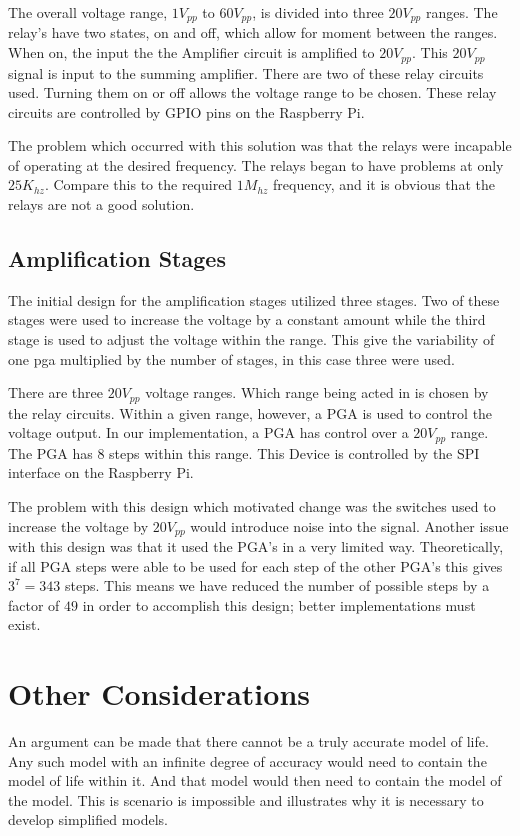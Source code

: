 \documentclass{article}	%
\begin{document}
\begin{multicols}{2}
The overall voltage range,
$1V_{pp}$ to $60V_{pp}$,
is divided into three $20V_{pp}$ ranges.
The relay's have two states,
on and off,
which allow for moment between the ranges.
When on,
the input the the Amplifier circuit is amplified to $20V_{pp}$.
This $20V_{pp}$ signal is input to the summing amplifier.
There are two of these relay circuits used.
Turning them on or off allows the voltage range to be chosen.
These relay circuits are controlled by 
GPIO pins on the Raspberry Pi.

The problem which occurred with this solution
was that the relays were incapable of
operating at the desired frequency.
The relays began to have problems at only $25K_{hz}$.
Compare this to the required $1M_{hz}$ frequency, and
it is obvious that the relays are not a good solution.

\subsection{Amplification Stages}
The initial design for the amplification stages
utilized three stages.
Two of these stages were used to increase the voltage by a constant amount while
the third stage is used to adjust the voltage within the range.
This give the variability of one pga multiplied by the number of stages,
in this case three were used.

There are three $20V_{pp}$ voltage ranges.
Which range being acted in is chosen by the relay circuits.
Within a given range,
however,
a PGA is used to control the voltage output.
In our implementation,
a PGA has control over a $20V_{pp}$ range.
The PGA has 8 steps within this range.
This Device is controlled by 
the SPI interface on the Raspberry Pi.

The problem with this design which motivated change was
the switches used to increase the voltage
by $20V_{pp}$ would introduce noise into the signal.
Another issue with this design was that
it used the PGA's in a very limited way.
Theoretically, if all PGA steps were able to
be used for each step of the other PGA's
this gives $3^7 = 343$ steps.
This means we have reduced the number of possible
steps by a factor of $49$ in order to accomplish
this design; better implementations must exist.

\newpage
\section{Other Considerations}
An argument can be made that there
cannot be a truly accurate model of life.
Any such model with an infinite degree of accuracy
would need to contain the model of life within it.
And that model would then need to contain
the model of the model.
This is scenario is impossible and 
illustrates why it is necessary to develop
simplified models.


\end{multicols}
\end{document}
